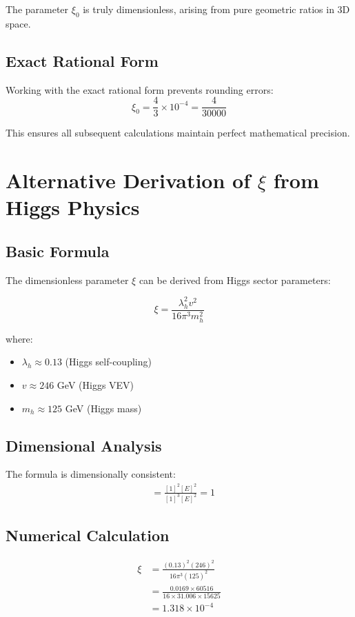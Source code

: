 \documentclass[12pt,a4paper]{article}
\theoremstyle{definition}
\begin{document}
		The parameter $\xi_0$ is truly dimensionless, arising from pure geometric ratios in 3D space.
	 
	
	\subsection{Exact Rational Form}
	
	Working with the exact rational form prevents rounding errors:
	\begin{equation}
		\xi_0 = \frac{4}{3} \times 10^{-4} = \frac{4}{30000}
	\end{equation}
	
	This ensures all subsequent calculations maintain perfect mathematical precision.
\section{Alternative Derivation of $\xi$ from Higgs Physics}
\label{sec:higgs-derivation}

\subsection{Basic Formula}
The dimensionless parameter $\xi$ can be derived from Higgs sector parameters:

\begin{equation}
	\xi = \frac{\lambda_h^2 v^2}{16\pi^3 m_h^2}
\end{equation}

where:
\begin{itemize}
	\item $\lambda_h \approx 0.13$ (Higgs self-coupling)
	\item $v \approx 246$ GeV (Higgs VEV)
	\item $m_h \approx 125$ GeV (Higgs mass)
\end{itemize}

\subsection{Dimensional Analysis}
The formula is dimensionally consistent:
\begin{align*}
	[\xi] &= \frac{[1]^2[E]^2}{[1]^3[E]^2} = 1
\end{align*}

\subsection{Numerical Calculation}
\begin{align*}
	\xi &= \frac{(0.13)^2(246)^2}{16\pi^3(125)^2} \\
	&= \frac{0.0169 \times 60516}{16 \times 31.006 \times 15625} \\
	&= 1.318 \times 10^{-4}
\end{align*}
\end{document}
